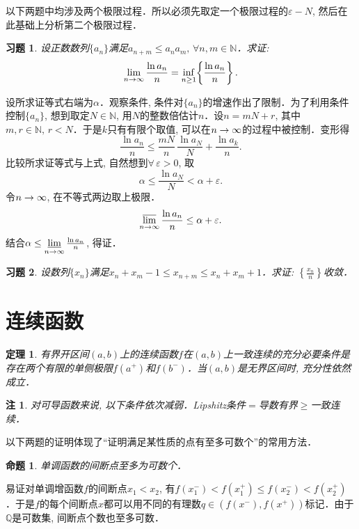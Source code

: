 \documentclass[11pt,a4paper]{ctexart}
\makeatletter
\theoremstyle{thmseries} %
\newtheorem{thm}{定理}[section]
\newtheorem{prop}{命题}[section]
\theoremstyle{exerseries}
\newtheorem{exer}{习题}[section]
\newtheorem*{rem}{注}
\renewenvironment{proof}[1][\proofname]{\par
  \pushQED{\qed}%
  \normalfont \topsep6\p@\@plus6\p@\relax
  \trivlist
  \item[\hskip\labelsep
        \itshape
    #1\@addpunct{}]\ignorespaces
}{%
  \popQED\endtrivlist\@endpefalse
}
\newenvironment{pf}{\begin{proof}[\bfseries\upshape 证\quad]}{\end{proof}}
\newcommand{\bra}[1]{\mathopen{}\left(#1\right)}
\newcommand{\cbra}[1]{\mathopen{}\left\{#1\right\}}
\renewcommand{\epsilon}{\varepsilon}
\newcommand{\N}{\mathbb{N}}
\newcommand{\Q}{\mathbb{Q}}
\def \nti {\mathnormal{n}\to\infty}
\DeclareMathOperator{\llim}{\underset{\nti}{\underline{\lim}}}
\DeclareMathOperator{\ulim}{\underset{\nti}{\overline{\lim}}}
\makeatother
\begin{document}
以下两题中均涉及两个极限过程．所以必须先取定一个极限过程的$\epsilon-N$, 然后在此基础上分析第二个极限过程．
\begin{exer}
	设正数数列$\{a_n\}$满足$a_{n+m}\leq a_na_m,\,\forall n,m\in\N$．求证: 
	\[\lim_{\nti}\frac{\ln a_n}{n}=\inf_{n\geq 1}\cbra{\frac{\ln a_n}{n}}.\]
\end{exer}
\begin{pf}
	设所求证等式右端为$\alpha$．观察条件, 条件对$\{a_n\}$的增速作出了限制．为了利用条件控制$\{a_n\}$, 想到取定$N\in\N$, 用$N$的整数倍估计$n$．设$n=mN+r$, 其中$m,r\in\N,\,r<N$．于是$k$只有有限个取值, 可以在$\nti$的过程中被控制．变形得
	\[\frac{\ln a_n}{n}\leq\frac{mN}{n}\,\frac{\ln a_N}{N}+\frac{\ln a_k}{n}.\]
	比较所求证等式与上式, 自然想到$\forall\,\epsilon>0$, 取
	\[\alpha\leq\frac{\ln a_N}{N}<\alpha+\epsilon.\]
	令$\nti$, 在不等式两边取上极限．
	\[\ulim\frac{\ln a_n}{n}\leq\alpha+\epsilon.\]
	结合$\alpha\leq\llim\frac{\ln a_n}{n}$, 得证．
\end{pf}

\begin{exer}
	设数列$\{x_n\}$满足$x_n+x_m-1\leq x_{n+m}\leq x_n+x_m+1$．求证: $\cbra{\frac{x_n}{n}}$收敛．
\end{exer}


\section{连续函数}
\begin{thm}
	有界开区间$(a,b)$上的连续函数$f$在$(a,b)$上一致连续的充分必要条件是存在两个有限的单侧极限$f(a^+)$和$f(b^-)$．当$(a,b)$是无界区间时, 充分性依然成立．
\end{thm}
\begin{rem}
	对可导函数来说, 以下条件依次减弱．Lipshitz条件$=$导数有界$\geq$一致连续．
\end{rem}


以下两题的证明体现了``证明满足某性质的点有至多可数个''的常用方法．
\begin{prop}
	单调函数的间断点至多为可数个．
\end{prop}
\begin{pf}
	易证对单调增函数$f$的间断点$x_1<x_2$, 有$f(x_1^-)<f(x_1^+)\leq f(x_2^-)<f(x_2^+)$．于是$f$的每个间断点$x$都可以用不同的有理数$q\in\bra{f(x^-),f(x^+)}$标记．由于$\Q$是可数集, 间断点个数也至多可数．
\end{pf}
\end{document}
